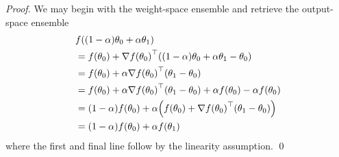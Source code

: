 \textit{Proof.} We may begin with the weight-space ensemble and retrieve the output-space ensemble
\begin{align}
    &f\mleft((1-\alpha) \theta_0 + \alpha \theta_1 \mright) \\
    &= f\mleft(\theta_0\mright) + \nabla f\mleft(\theta_0\mright)^\top \mleft( (1-\alpha) \theta_0 + \alpha \theta_1 - \theta_0 \mright) \\
    &= f\mleft(\theta_0\mright) + \alpha \nabla f\mleft(\theta_0\mright)^\top \mleft( \theta_1 - \theta_0 \mright) \\
    &= f\mleft(\theta_0\mright) + \alpha \nabla f\mleft(\theta_0\mright)^\top \mleft( \theta_1 - \theta_0 \mright) + \alpha f\mleft(\theta_0\mright) - \alpha f\mleft(\theta_0\mright) \\
    &= (1-\alpha) f\mleft(\theta_0\mright) + \alpha \mleft(f\mleft(\theta_0\mright) +  \nabla f\mleft(\theta_0\mright)^\top \mleft( \theta_1 - \theta_0 \mright) \mright) \\
    &= (1-\alpha) f\mleft(\theta_0\mright) + \alpha f\mleft(\theta_1 \mright)
\end{align}
where the first and final line follow by the linearity assumption. \qed



 











